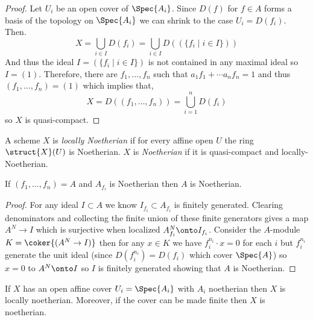 \documentclass[12pt]{article}
\begin{document}
\begin{proof}
Let $U_i$ be an open cover of $\Spec{A_i}$. Since $D(f)$ for $f \in A$ forms a basis of the topology on $\Spec{A_i}$ we can shrink to the case $U_i = D(f_i)$. Then.
\[ X = \bigcup_{i  \in I} D(f_i) = \bigcup_{i \in I} D(( \{ f_i \mid i \in I \} )) \]
And thus the ideal $I = ( \{ f_i \mid i \in I \} )$ is not contained in any maximal ideal so $I = (1)$. Therefore, there are $f_1, \dots, f_n$ such that $a_1 f_1 + \cdots a_n f_n = 1$ and thus $(f_1, \dots, f_n) = (1)$ which implies that,
\[ X = D((f_1, \dots, f_n)) = \bigcup_{i = 1}^n D(f_i) \]
so $X$ is quasi-compact.
\end{proof}

\begin{defn}
A scheme $X$ is \textit{locally Noetherian} if for every affine open $U$ the ring $\struct{X}(U)$ is Noetherian. $X$ is \textit{Noetherian} if it is quasi-compact and locally-Noetherian. 
\end{defn}

\begin{lemma}
If $(f_1, \dots, f_n) = A$ and $A_{f_i}$ is Noetherian then $A$ is Noetherian.
\end{lemma}

\begin{proof}
For any ideal $I \subset A$ we know $I_{f_i} \subset A_{f_i}$ is finitely generated. Clearing denominators and collecting the finite union of these finite generators gives a map $A^N \to I$ which is surjective when localized $A^N_{f_i} \onto I_{f_i}$. Consider the $A$-module $K = \coker{(A^N \to I)}$ then for any $x \in K$ we have $f_i^{n_i} \cdot x = 0$ for each $i$ but $f_i^{n_i}$ generate the unit ideal (since $D(f_i^{n_i}) = D(f_i)$ which cover $\Spec{A}$) so $x = 0$ to $A^N \onto I$ so $I$ is finitely generated showing that $A$ is Noetherian.
\end{proof}

\begin{lemma}
If $X$ has an open affine cover $U_i = \Spec{A_i}$ with $A_i$ noetherian then $X$ is locally noetherian. Moreover, if the cover can be made finite then $X$ is noetherian. 
\end{lemma}
\end{document}
